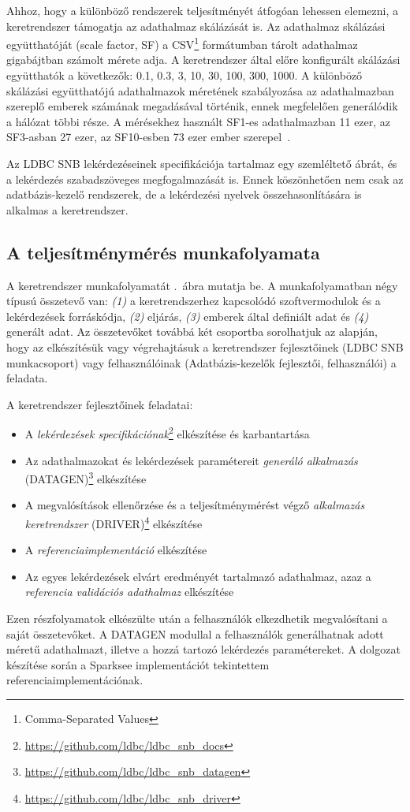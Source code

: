 Ahhoz, hogy a különböző rendszerek teljesítményét átfogóan lehessen elemezni, a keretrendszer támogatja az adathalmaz skálázását is. Az adathalmaz skálázási együtthatóját (scale factor, SF) a CSV\footnote{Comma-Separated Values} formátumban tárolt adathalmaz gigabájtban számolt mérete adja. A keretrendszer által előre konfigurált skálázási együtthatók a következők: 0.1, 0.3, 3, 10, 30, 100, 300, 1000. A különböző skálázási együtthatójú adathalmazok méretének szabályozása az adathalmazban szereplő emberek számának megadásával történik, ennek megfelelően generálódik a hálózat többi része. A mérésekhez használt SF1-es adathalmazban 11 ezer, az SF3-asban 27 ezer, az SF10-esben 73 ezer ember szerepel~\cite{LDBC_SNB}.

Az LDBC SNB lekérdezéseinek specifikációja tartalmaz egy szemléltető ábrát, és a lekérdezés szabadszöveges megfogalmazását is. Ennek köszönhetően nem csak az adatbázis-kezelő rendszerek, de a lekérdezési nyelvek összehasonlítására is alkalmas a keretrendszer.

\subsection{A teljesítménymérés munkafolyamata}

A keretrendszer munkafolyamatát .~ábra mutatja be. A munkafolyamatban négy típusú összetevő van: \textit{(1)} a keretrendszerhez kapcsolódó szoftvermodulok és a lekérdezések forráskódja, \textit{(2)} eljárás, \textit{(3)} emberek által definiált adat és \textit{(4)} generált adat. Az összetevőket továbbá két csoportba sorolhatjuk az alapján, hogy az elkészítésük vagy végrehajtásuk a keretrendszer fejlesztőinek (LDBC SNB munkacsoport) vagy felhasználóinak (Adatbázis-kezelők fejlesztői, felhasználói) a feladata.

A keretrendszer fejlesztőinek feladatai:
\begin{itemize}
	\item A \textit{lekérdezések specifikációnak}\footnote{\url{https://github.com/ldbc/ldbc_snb_docs}} elkészítése és karbantartása~\cite{LDBC_SNB}
	\item Az adathalmazokat és lekérdezések paramétereit \textit{generáló alkalmazás} (DATAGEN)\footnote{\url{https://github.com/ldbc/ldbc_snb_datagen}} elkészítése
	\item A megvalósítások ellenőrzése és a teljesítménymérést végző \textit{alkalmazás keretrendszer} (DRIVER)\footnote{\url{https://github.com/ldbc/ldbc_snb_driver}} elkészítése
	\item A \textit{referenciaimplementáció} elkészítése
	\item Az egyes lekérdezések elvárt eredményét tartalmazó adathalmaz, azaz a \textit{referencia validációs adathalmaz} elkészítése
\end{itemize}
Ezen részfolyamatok elkészülte után a felhasználók elkezdhetik megvalósítani a saját összetevőket. A DATAGEN modullal a felhasználók generálhatnak adott méretű adathalmazt, illetve a hozzá tartozó lekérdezés paramétereket. A dolgozat készítése során a Sparksee implementációt tekintettem referenciaimplementációnak.

